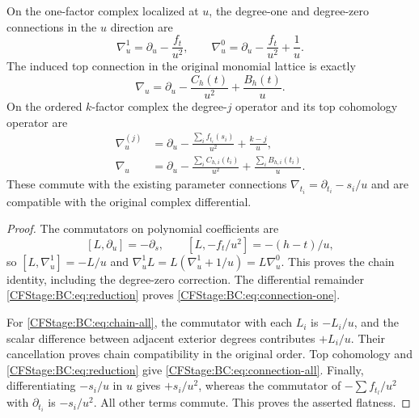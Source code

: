 \begin{theorem}
On the one-factor complex localized at $u$, the degree-one and
degree-zero connections in the $u$ direction are
\begin{equation}
 \nabla_u^1=\partial_u-\frac{f_t}{u^2},\qquad
 \nabla_u^0=\partial_u-\frac{f_t}{u^2}+\frac1u.
 \label{CFStage:BC:eq:chain-one}
\end{equation}
The induced top connection in the original monomial lattice is exactly
\begin{equation}
 \boxed{\nabla_u=\partial_u-\frac{C_h(t)}{u^2}
                                  +\frac{B_h(t)}u.}
 \label{CFStage:BC:eq:connection-one}
\end{equation}
On the ordered $k$-factor complex the degree-$j$ operator and its top
cohomology operator are
\begin{align}
 \nabla_u^{(j)}&=\partial_u-
       \frac{\sum_i f_{t_i}(s_i)}{u^2}+\frac{k-j}{u},
       \label{CFStage:BC:eq:chain-all}\\
 \boxed{\nabla_u}&=\boxed{\partial_u-
       \frac{\sum_i C_{h,i}(t_i)}{u^2}
                +\frac{\sum_i B_{h,i}(t_i)}u.}
       \label{CFStage:BC:eq:connection-all}
\end{align}
These commute with the existing parameter connections
$\nabla_{t_i}=\partial_{t_i}-s_i/u$ and are compatible with the
original complex differential.
\end{theorem}
\begin{proof}
The commutators on polynomial coefficients are
\[
 [L,\partial_u]=-\partial_s,\qquad
 [L,-f_t/u^2]=-(h-t)/u,
\]
so $[L,\nabla_u^1]=-L/u$ and
$\nabla_u^1L=L(\nabla_u^1+1/u)=L\nabla_u^0$.
This proves the chain identity, including the degree-zero correction.
The differential remainder \eqref{CFStage:BC:eq:reduction} proves
\eqref{CFStage:BC:eq:connection-one}.

For \eqref{CFStage:BC:eq:chain-all}, the commutator with each $L_i$ is
$-L_i/u$, and the scalar difference between adjacent exterior degrees
contributes $+L_i/u$.  Their cancellation proves chain compatibility
in the original order.  Top cohomology and
\eqref{CFStage:BC:eq:reduction} give \eqref{CFStage:BC:eq:connection-all}.
Finally, differentiating $-s_i/u$ in $u$ gives $+s_i/u^2$, whereas
the commutator of $-\sum f_{t_l}/u^2$ with $\partial_{t_i}$ is
$-s_i/u^2$.  All other terms commute.  This proves the asserted
flatness.
\end{proof}

